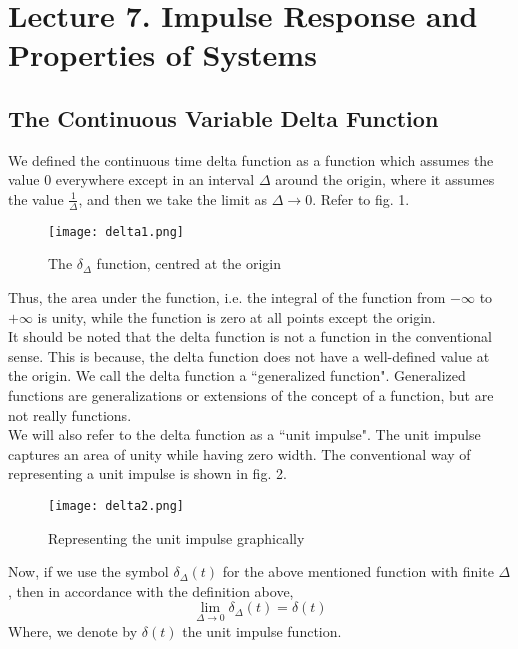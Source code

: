 \section{Lecture 7. Impulse Response and Properties of Systems}


\subsection{The Continuous Variable Delta Function}
We defined the continuous time delta function as a function which assumes the value 0 everywhere except in an interval $\Delta$ around the origin, where it assumes the value $\frac{1}{\Delta}$, and then we take the limit as $\Delta \rightarrow 0$. Refer to fig. 1. \\ 
\begin{figure}[H]
	\centering
	\texttt{[image: delta1.png]}
	\caption{The $\delta_\Delta$ function, centred at the origin}
\end{figure}
Thus, the area under the function, i.e. the integral of the function from $-\infty$ to $+\infty$ is unity, while the function is zero at all points except the origin.\\
\indent It should be noted that the delta function is not a function in the conventional sense. This is because, the delta function does not have a well-defined value at the origin. We call the delta function a ``generalized function". Generalized functions are generalizations or extensions of the concept of a function, but are not really functions.\\
\indent We will also refer to the delta function as a ``unit impulse". The unit impulse captures an area of unity while having zero width. The conventional way of representing a unit impulse is shown in fig. 2.\\
\begin{figure}[H]
	\centering
	\texttt{[image: delta2.png]}
	\caption{Representing the unit impulse graphically}
\end{figure}
\indent Now, if we use the symbol $\delta_\Delta (t)$ for the above mentioned function with finite $\Delta$, then in accordance with the definition above,
$$\lim_{\Delta\rightarrow 0}\delta_\Delta(t)=\delta(t)$$
Where, we denote by $\delta(t)$ the unit impulse function.

